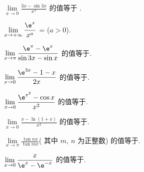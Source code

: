 \begin{problem} $\lim\limits_{x \rightarrow 0}\displaystyle \frac{3x - \sin 3x}{x^{3}}$ 的值等于
.

\end{problem}

\begin{problem} $\lim\limits_{x \rightarrow + \infty}\displaystyle \frac{\e^{x}}{x^{a}}$ = \fillin{$+ \infty$}
($a > 0$).



\end{problem}

\begin{problem} $\lim\limits_{x \rightarrow \pi}\displaystyle \frac{\e^{\pi} - \e^{x}}{\sin 3x - \sin x}$
的值等于.

\end{problem}

\begin{problem} $\lim\limits_{x \rightarrow 0}\displaystyle \frac{\e^{3x} - 1 - x}{2x}$
的值等于.

\end{problem}

\begin{problem} $\lim\limits_{x \rightarrow 0}\displaystyle \frac{\e^{x^{2}} - \cos x}{x^{2}}$
的值等于.


\end{problem}

\begin{problem} $\lim\limits_{x \rightarrow 0}\displaystyle \frac{x - \ln\left( 1 + x \right)}{x^{2}}$
的值等于.

\end{problem}

\begin{problem} $\lim\limits_{x \rightarrow \pi}\displaystyle \frac{\tan nx}{\tan mx}$( 其中 $m,\ n$
为正整数) 的值等于.

\end{problem}

\begin{problem} $\displaystyle \lim\limits_{x \rightarrow 0}\frac{x}{\e^{x} - \e^{- x}}$
的值等于.

\end{problem}

